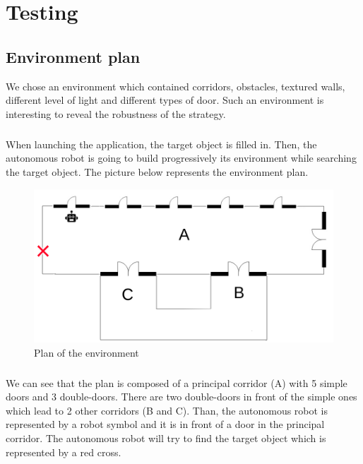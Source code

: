 \documentclass[12pt]{report}
\begin{document}
	\chapter{Testing}
	\paragraph{}
	\section{Environment plan}
	We chose an environment which contained corridors, obstacles, textured walls, different level of light and different types of door. Such an environment is interesting to reveal the robustness of the strategy.
		
	\paragraph{}
	When launching the application, the target object is filled in. Then, the autonomous robot is going to build progressively its environment while searching the target object. The picture below represents the environment plan.
	\begin{figure}[H]
		\begin{center}
			\includegraphics[scale=0.55]{res/plan.png}
			\caption{Plan of the environment}
		\end{center}
	\end{figure}
	\paragraph{}
	We can see that the plan is composed of a principal corridor (A) with 5 simple doors and 3 double-doors. There are two double-doors in front of the simple ones which lead to 2 other corridors (B and C). Than, the autonomous robot is represented by a robot symbol and it is in front of a door in the principal corridor. The autonomous robot will try to find the target object which is represented by a red cross.
\end{document}
